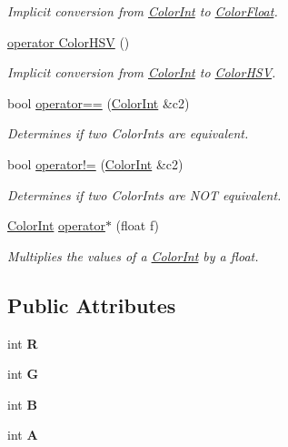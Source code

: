 \begin{DoxyCompactItemize}
\begin{DoxyCompactList}\small\item\em Implicit conversion from \hyperlink{structtsgl_1_1_color_int}{Color\+Int} to \hyperlink{structtsgl_1_1_color_float}{Color\+Float}. \end{DoxyCompactList}\item 
\hyperlink{structtsgl_1_1_color_int_acbd82ad2c6388389aa3474f042a25353}{operator Color\+H\+SV} ()
\begin{DoxyCompactList}\small\item\em Implicit conversion from \hyperlink{structtsgl_1_1_color_int}{Color\+Int} to \hyperlink{structtsgl_1_1_color_h_s_v}{Color\+H\+SV}. \end{DoxyCompactList}\item 
bool \hyperlink{structtsgl_1_1_color_int_a7d6282c79f42d4ba9a70c4475b8170c2}{operator==} (\hyperlink{structtsgl_1_1_color_int}{Color\+Int} \&c2)
\begin{DoxyCompactList}\small\item\em Determines if two Color\+Ints are equivalent. \end{DoxyCompactList}\item 
bool \hyperlink{structtsgl_1_1_color_int_af83865a1b76eb8c0a5e0fe4bc34fab2d}{operator!=} (\hyperlink{structtsgl_1_1_color_int}{Color\+Int} \&c2)
\begin{DoxyCompactList}\small\item\em Determines if two Color\+Ints are {\itshape N\+OT} equivalent. \end{DoxyCompactList}\item 
\hyperlink{structtsgl_1_1_color_int}{Color\+Int} \hyperlink{structtsgl_1_1_color_int_aa6dbbe3d7d1653e16eadc1843a6c3be1}{operator$\ast$} (float f)
\begin{DoxyCompactList}\small\item\em Multiplies the values of a \hyperlink{structtsgl_1_1_color_int}{Color\+Int} by a float. \end{DoxyCompactList}\end{DoxyCompactItemize}
\subsection*{Public Attributes}
\begin{DoxyCompactItemize}
\item 
\mbox{\label{structtsgl_1_1_color_int_a72ab1d2040360a98871f96bccdc85da6}} 
int {\bfseries R}
\item 
\mbox{\label{structtsgl_1_1_color_int_a031a5d8f7e402908648ed67d04341796}} 
int {\bfseries G}
\item 
\mbox{\label{structtsgl_1_1_color_int_a3f8bc859cdf8167c3aaaabb493301ea8}} 
int {\bfseries B}
\item 
\mbox{\label{structtsgl_1_1_color_int_af095bf47ede3084b3d0b4ca5e5638ce3}} 
int {\bfseries A}
\end{DoxyCompactItemize}



